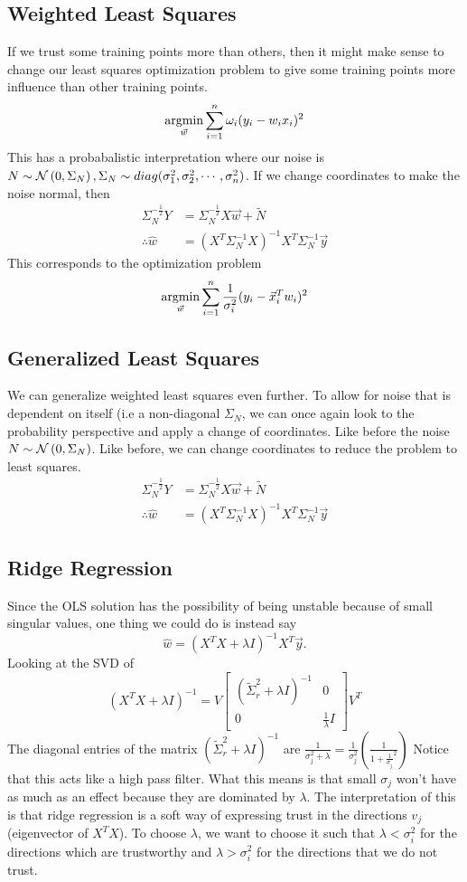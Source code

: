 \subsection{Weighted Least Squares}
If we trust some training points more than others, then it might make sense to change our least squares optimization problem to give some training points more influence than other training points.
\[
  \operatorname*{argmin}_{\vec{w}} \sum_{i=1}^{n}\omega_i(y_i - w_ix_i)^2
\]
This has a probabalistic interpretation where our noise is $N\sim\mathcal{N}\left(0, \Sigma_N\right), \Sigma_N\sim diag(\sigma_1^2, \sigma_2^2,\cdots, \sigma_n^2)$.
If we change coordinates to make the noise \iid normal, then
\begin{align*}
  \Sigma_N^{-\frac{1}{2}}Y &= \Sigma_N^{-\frac{1}{2}}X\vec{w}+\tilde{N}\\
  \therefore \hat{w} &= (X^T\Sigma_N^{-1}X)^{-1}X^T\Sigma_N^{-1}\vec{y}
\end{align*}
This corresponds to the optimization problem 
\[
  \operatorname*{argmin}_{\vec{w}} \sum_{i=1}^{n}\frac{1}{\sigma_i^2}(y_i - \vec{x}_i^Tw_i)^2
\]
\subsection{Generalized Least Squares}
We can generalize weighted least squares even further. To allow for noise that is dependent on itself (i.e a non-diagonal $\Sigma_N$, we can once again look to the probability perspective and apply a change of coordinates. Like before the noise $N\sim\mathcal{N}\left(0, \Sigma_N\right)$. Like before, we can change coordinates to reduce the problem to least squares.
\begin{align*}
  \Sigma_N^{-\frac{1}{2}}Y &= \Sigma_N^{-\frac{1}{2}}X\vec{w}+\tilde{N}\\
  \therefore \hat{w} &= (X^T\Sigma_N^{-1}X)^{-1}X^T\Sigma_N^{-1}\vec{y}
\end{align*}
\subsection{Ridge Regression}
Since the OLS solution has the possibility of being unstable because of small singular values, one thing we could do is instead say
$$\hat{w} = (X^TX + \lambda I)^{-1}X^T\vec{y}.$$
Looking at the SVD of 
\[
  (X^TX+\lambda I)^{-1} = V \begin{bmatrix}
    (\tilde{\Sigma}_r^2 + \lambda I)^{-1} & 0\\
    0 & \frac{1}{\lambda}I
  \end{bmatrix} V^T
\]
The diagonal entries of the matrix $(\tilde{\Sigma}_r^2 + \lambda I)^{-1}$ are $\frac{1}{\sigma_j^2+\lambda}=\frac{1}{\sigma_j^2}\left(\frac{1}{1+\frac{1}{\sigma_j}^2}\right)$
Notice that this acts like a high pass filter. What this means is that small $\sigma_j$ won't have as much as an effect because they are dominated by $\lambda$. The interpretation of this is that ridge regression is a soft way of expressing trust in the directions $v_j$ (eigenvector of $X^TX$). To choose $\lambda$, we want to choose it such that $\lambda<\sigma_i^2$ for the directions which are trustworthy and $\lambda>\sigma_i^2$ for the directions that we do not trust.
